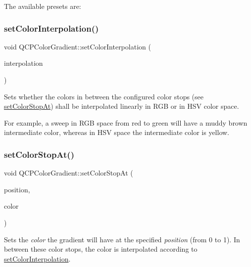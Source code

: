 The available presets are\+:  \mbox{\label{class_q_c_p_color_gradient_aa13fda86406e1d896a465a409ae63b38}} 
\subsubsection{\texorpdfstring{set\+Color\+Interpolation()}{setColorInterpolation()}}
{\footnotesize\ttfamily void Q\+C\+P\+Color\+Gradient\+::set\+Color\+Interpolation (\begin{DoxyParamCaption}\item[{\hyperlink{class_q_c_p_color_gradient_ac5dca17cc24336e6ca176610e7f77fc1}{Q\+C\+P\+Color\+Gradient\+::\+Color\+Interpolation}}]{interpolation }\end{DoxyParamCaption})}

Sets whether the colors in between the configured color stops (see \hyperlink{class_q_c_p_color_gradient_a3b48be5e78079db1bb2a1188a4c3390e}{set\+Color\+Stop\+At}) shall be interpolated linearly in R\+GB or in H\+SV color space.

For example, a sweep in R\+GB space from red to green will have a muddy brown intermediate color, whereas in H\+SV space the intermediate color is yellow. \mbox{\label{class_q_c_p_color_gradient_a3b48be5e78079db1bb2a1188a4c3390e}} 
\subsubsection{\texorpdfstring{set\+Color\+Stop\+At()}{setColorStopAt()}}
{\footnotesize\ttfamily void Q\+C\+P\+Color\+Gradient\+::set\+Color\+Stop\+At (\begin{DoxyParamCaption}\item[{double}]{position,  }\item[{const Q\+Color \&}]{color }\end{DoxyParamCaption})}

Sets the {\itshape color} the gradient will have at the specified {\itshape position} (from 0 to 1). In between these color stops, the color is interpolated according to \hyperlink{class_q_c_p_color_gradient_aa13fda86406e1d896a465a409ae63b38}{set\+Color\+Interpolation}.

